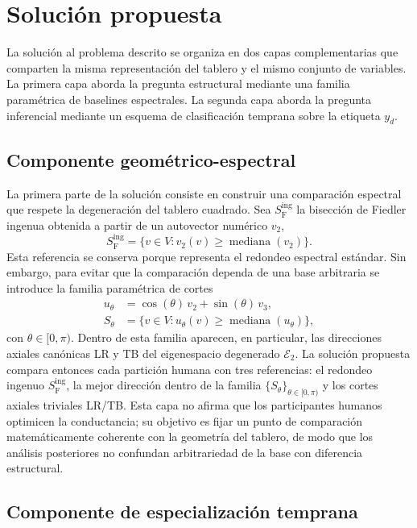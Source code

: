 \documentclass[journal]{IEEEtran}
\newcommand{\Sing}{S^{\mathrm{ing}}_{\mathrm{F}}}
\newcommand{\Etwo}{\mathcal{E}_2}
\begin{document}
\section{Solución propuesta}\label{sec:solucion}

La solución al problema descrito se organiza en dos capas complementarias que comparten la misma representación del tablero y el mismo conjunto de variables. La primera capa aborda la pregunta estructural mediante una familia paramétrica de baselines espectrales. La segunda capa aborda la pregunta inferencial mediante un esquema de clasificación temprana sobre la etiqueta $y_d$.

\subsection{Componente geométrico-espectral}

La primera parte de la solución consiste en construir una comparación espectral que respete la degeneración del tablero cuadrado. Sea $\Sing$ la bisección de Fiedler ingenua obtenida a partir de un autovector numérico $v_2$,
\begin{equation}
\Sing = \bigl\{v \in V : v_2(v) \ge \operatorname{mediana}(v_2) \bigr\}.
\label{eq:naive}
\end{equation}
Esta referencia se conserva porque representa el redondeo espectral estándar. Sin embargo, para evitar que la comparación dependa de una base arbitraria se introduce la familia paramétrica de cortes
\begin{align}
u_\theta &= \cos(\theta)\,v_2 + \sin(\theta)\,v_3, \label{eq:utheta}\\
S_\theta &= \bigl\{v \in V : u_\theta(v) \ge \operatorname{mediana}(u_\theta) \bigr\},
\end{align}
con $\theta \in [0,\pi)$. Dentro de esta familia aparecen, en particular, las direcciones axiales canónicas LR y TB del eigenespacio degenerado $\Etwo$. La solución propuesta compara entonces cada partición humana con tres referencias: el redondeo ingenuo $\Sing$, la mejor dirección dentro de la familia $\{S_\theta\}_{\theta \in [0,\pi)}$ y los cortes axiales triviales LR/TB. Esta capa no afirma que los participantes humanos optimicen la conductancia; su objetivo es fijar un punto de comparación matemáticamente coherente con la geometría del tablero, de modo que los análisis posteriores no confundan arbitrariedad de la base con diferencia estructural.

\subsection{Componente de especialización temprana}
\end{document}
